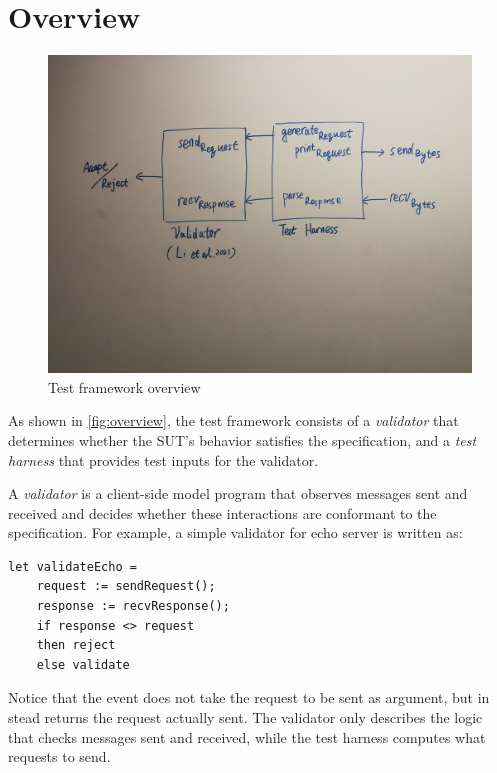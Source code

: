 \section{Overview}
\begin{figure}
  \centering
  \includegraphics[width=.9\textwidth]{figures/overview}
  \caption{Test framework overview}
  \label{fig:overview}
\end{figure}

As shown in \autoref{fig:overview}, the test framework consists of a {\em
  validator} that determines whether the SUT's behavior satisfies the
specification, and a {\em test harness} that provides test inputs for the
validator.

A {\em validator} is a client-side model program that observes messages sent and
received and decides whether these interactions are conformant to the
specification.  For example, a simple validator for echo server is written as:
\begin{lstlisting}[style=customcoq]
  let validateEcho =
    request := sendRequest();
    response := recvResponse();
    if response <> request
    then reject
    else validate
\end{lstlisting}
Notice that the  event does not take the request to be sent as
argument, but in stead returns the request actually sent.  The validator only
describes the logic that checks messages sent and received, while the test
harness computes what requests to send.


